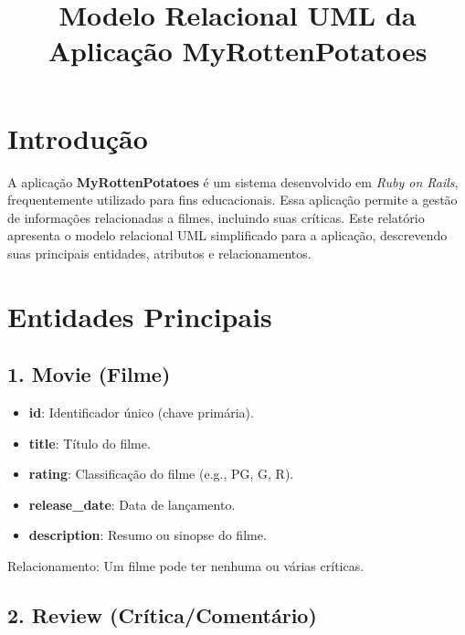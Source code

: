 \documentclass[a4paper,12pt]{article}
\title{Modelo Relacional UML da Aplicação MyRottenPotatoes}
\author{}
\date{}
\begin{document}
 
\maketitle
 
\section*{Introdução}

A aplicação \textbf{MyRottenPotatoes} é um sistema desenvolvido em \textit{Ruby on Rails}, frequentemente utilizado para fins educacionais. Essa aplicação permite a gestão de informações relacionadas a filmes, incluindo suas críticas. Este relatório apresenta o modelo relacional UML simplificado para a aplicação, descrevendo suas principais entidades, atributos e relacionamentos.
 
\section*{Entidades Principais}
 
\subsection*{1. Movie (Filme)}

\begin{itemize}

    \item \textbf{id}: Identificador único (chave primária).

    \item \textbf{title}: Título do filme.

    \item \textbf{rating}: Classificação do filme (e.g., PG, G, R).

    \item \textbf{release\_date}: Data de lançamento.

    \item \textbf{description}: Resumo ou sinopse do filme.

\end{itemize}

Relacionamento: Um filme pode ter nenhuma ou várias críticas.
 
\subsection*{2. Review (Crítica/Comentário)}
\end{document}
